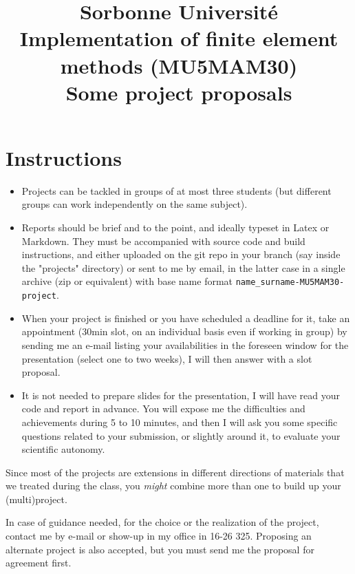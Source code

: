 \documentclass[11pt]{article}
\title{\bf 
	Sorbonne Université\\
	Implementation of finite element methods (MU5MAM30)\\[1cm]
	Some project proposals
}
\author{}
\date{}
\begin{document}
\maketitle


\section*{Instructions}

\begin{itemize}

\item Projects can be tackled in groups of at most three students (but different groups
can work independently on the same subject). 
\item Reports should be brief and to the
point, and ideally typeset in Latex or Markdown. They must be accompanied with source
code and build instructions, and either uploaded on the git repo in your branch
(say inside the "projects" directory) or sent to me by email, in the latter case 
in a single archive (zip or equivalent) with base name format 
\texttt{name\_surname-MU5MAM30-project}. 
\item When your project is finished or you have scheduled a deadline for it,  
take an appointment (30min slot, on an individual basis even if working in group) 
by sending me an e-mail listing your availabilities in the foreseen window for the 
presentation (select one to two weeks), I will then answer with a slot proposal.
\item
It is not needed to prepare slides for the presentation, I will 
have read your code and report in advance. You will expose me the difficulties 
and achievements during 5 to 10 minutes, and then I will ask you some specific questions 
related to your submission, or slightly around it, to evaluate your scientific autonomy.
\end{itemize}

Since most of the projects are extensions in different directions of
materials that we treated during the class, you {\it might} combine more
than one to build up your (multi)project.


\medskip
In case of guidance needed, for the choice or the realization of the project, 
contact me by e-mail or show-up in my office in 16-26 325. Proposing an
alternate project is also accepted, but you must send me the proposal for
agreement first.
\end{document}
